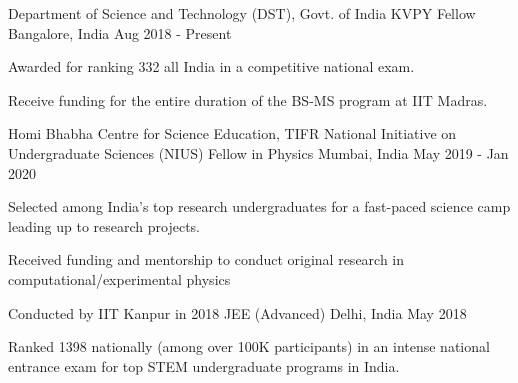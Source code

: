 

\begin{cventries}
  
  \cventry
    {Department of Science and Technology (DST), Govt. of India} %
    {KVPY Fellow} %
    {Bangalore, India} %
    {Aug 2018 - Present} %
    {
      \begin{cvitems} %
        \item {Awarded for ranking 332 all India in a competitive national exam.}
        \item {Receive funding for the entire duration of the BS-MS program at IIT Madras.}
      \end{cvitems}
    }

  \vspace{1ex}


  \cventry
    {Homi Bhabha Centre for Science Education, TIFR} %
    {National Initiative on Undergraduate Sciences (NIUS) Fellow in Physics} %
    {Mumbai, India} %
    {May 2019 - Jan 2020} %
    {
      \begin{cvitems} %
        \item {Selected among India's top research undergraduates for a fast-paced science camp leading up to research projects.}
        \item {Received funding and mentorship to conduct original research in computational/experimental physics}
      \end{cvitems}
    }

    \vspace{1ex}


  \cventry
    {Conducted by IIT Kanpur in 2018} %
    {JEE (Advanced)} %
    {Delhi, India} %
    {May 2018} %
    {
      \begin{cvitems} %
        \item {Ranked 1398 nationally (among over 100K participants) in an intense national entrance exam for top STEM undergraduate programs in India.}
      \end{cvitems}
    }


\end{cventries}
